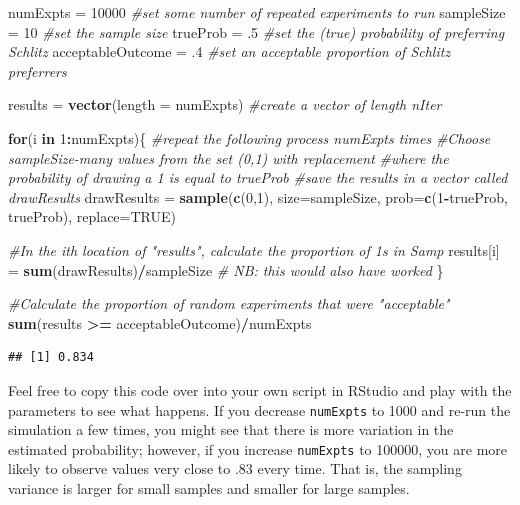 \documentclass[openany]{book}
\newenvironment{Shaded}{\begin{snugshade}}{\end{snugshade}}
\newcommand{\CommentTok}[1]{\textcolor[rgb]{0.56,0.35,0.01}{\textit{#1}}}
\newcommand{\ControlFlowTok}[1]{\textcolor[rgb]{0.13,0.29,0.53}{\textbf{#1}}}
\newcommand{\DataTypeTok}[1]{\textcolor[rgb]{0.13,0.29,0.53}{#1}}
\newcommand{\DecValTok}[1]{\textcolor[rgb]{0.00,0.00,0.81}{#1}}
\newcommand{\FloatTok}[1]{\textcolor[rgb]{0.00,0.00,0.81}{#1}}
\newcommand{\KeywordTok}[1]{\textcolor[rgb]{0.13,0.29,0.53}{\textbf{#1}}}
\newcommand{\NormalTok}[1]{#1}
\newcommand{\OperatorTok}[1]{\textcolor[rgb]{0.81,0.36,0.00}{\textbf{#1}}}
\newcommand{\OtherTok}[1]{\textcolor[rgb]{0.56,0.35,0.01}{#1}}
\newcommand{\StringTok}[1]{\textcolor[rgb]{0.31,0.60,0.02}{#1}}
\begin{document}
\begin{Shaded}
\begin{Highlighting}[]
\NormalTok{numExpts =}\StringTok{ }\DecValTok{10000} \CommentTok{#set some number of repeated experiments to run}
\NormalTok{sampleSize =}\StringTok{ }\DecValTok{10} \CommentTok{#set the sample size  }
\NormalTok{trueProb =}\StringTok{ }\FloatTok{.5} \CommentTok{#set the (true) probability of preferring Schlitz}
\NormalTok{acceptableOutcome =}\StringTok{ }\FloatTok{.4} \CommentTok{#set an acceptable proportion of Schlitz preferrers}

\NormalTok{results =}\StringTok{ }\KeywordTok{vector}\NormalTok{(}\DataTypeTok{length =}\NormalTok{ numExpts) }\CommentTok{#create a vector of length nIter}

\ControlFlowTok{for}\NormalTok{(i }\ControlFlowTok{in} \DecValTok{1}\OperatorTok{:}\NormalTok{numExpts)\{ }\CommentTok{#repeat the following process numExpts times}
   \CommentTok{#Choose sampleSize-many values from the set (0,1) with replacement}
   \CommentTok{#where the probability of drawing a 1 is equal to trueProb}
   \CommentTok{#save the results in a vector called drawResults}
\NormalTok{   drawResults =}\StringTok{ }\KeywordTok{sample}\NormalTok{(}\KeywordTok{c}\NormalTok{(}\DecValTok{0}\NormalTok{,}\DecValTok{1}\NormalTok{), }\DataTypeTok{size=}\NormalTok{sampleSize, }\DataTypeTok{prob=}\KeywordTok{c}\NormalTok{(}\DecValTok{1}\OperatorTok{-}\NormalTok{trueProb, trueProb), }\DataTypeTok{replace=}\OtherTok{TRUE}\NormalTok{)}
   
   \CommentTok{#In the ith location of "results", calculate the proportion of 1s in Samp}
\NormalTok{   results[i] =}\StringTok{ }\KeywordTok{sum}\NormalTok{(drawResults)}\OperatorTok{/}\NormalTok{sampleSize}
   \CommentTok{# NB: this would also have worked }
\NormalTok{\}}

\CommentTok{#Calculate the proportion of random experiments that were "acceptable"}
\KeywordTok{sum}\NormalTok{(results }\OperatorTok{>=}\StringTok{ }\NormalTok{acceptableOutcome)}\OperatorTok{/}\NormalTok{numExpts}
\end{Highlighting}
\end{Shaded}

\begin{verbatim}
## [1] 0.834
\end{verbatim}

Feel free to copy this code over into your own script in RStudio and play with the parameters to see what happens. If you decrease \texttt{numExpts} to 1000 and re-run the simulation a few times, you might see that there is more variation in the estimated probability; however, if you increase \texttt{numExpts} to 100000, you are more likely to observe values very close to .83 every time. That is, the sampling variance is larger for small samples and smaller for large samples.
\end{document}
